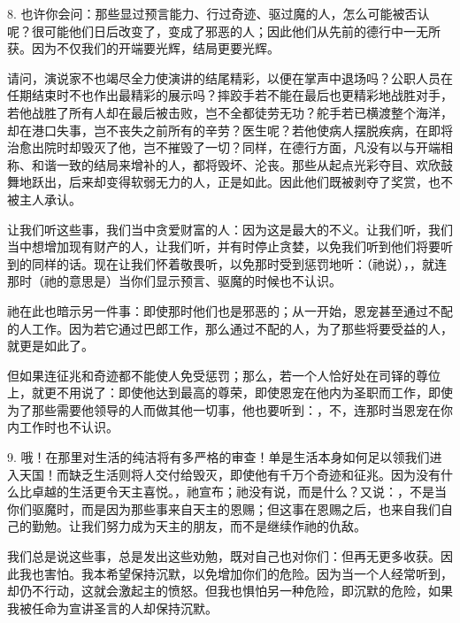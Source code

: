 8. 也许你会问：那些显过预言能力、行过奇迹、驱过魔的人，怎么可能被否认呢？很可能他们日后改变了，变成了邪恶的人；因此他们从先前的德行中一无所获。因为不仅我们的开端要光辉，结局更要光辉。\par

请问，演说家不也竭尽全力使演讲的结尾精彩，以便在掌声中退场吗？公职人员在任期结束时不也作出最精彩的展示吗？摔跤手若不能在最后也更精彩地战胜对手，若他战胜了所有人却在最后被击败，岂不全都徒劳无功？舵手若已横渡整个海洋，却在港口失事，岂不丧失之前所有的辛劳？医生呢？若他使病人摆脱疾病，在即将治愈出院时却毁灭了他，岂不摧毁了一切？同样，在德行方面，凡没有以与开端相称、和谐一致的结局来增补的人，都将毁坏、沦丧。那些从起点光彩夺目、欢欣鼓舞地跃出，后来却变得软弱无力的人，正是如此。因此他们既被剥夺了奖赏，也不被主人承认。\par

让我们听这些事，我们当中贪爱财富的人：因为这是最大的不义。让我们听，我们当中想增加现有财产的人，让我们听，并有时停止贪婪，以免我们听到他们将要听到的同样的话。现在让我们怀着敬畏听，以免那时受到惩罚地听：（祂说），，就连那时（祂的意思是）当你们显示预言、驱魔的时候也不认识。\par

祂在此也暗示另一件事：即使那时他们也是邪恶的；从一开始，恩宠甚至通过不配的人工作。因为若它通过巴郎工作，那么通过不配的人，为了那些将要受益的人，就更是如此了。\par

但如果连征兆和奇迹都不能使人免受惩罚；那么，若一个人恰好处在司铎的尊位上，就更不用说了：即使他达到最高的尊荣，即使恩宠在他内为圣职而工作，即使为了那些需要他领导的人而做其他一切事，他也要听到：，不，连那时当恩宠在你内工作时也不认识。\par

9. 哦！在那里对生活的纯洁将有多严格的审查！单是生活本身如何足以领我们进入天国！而缺乏生活则将人交付给毁灭，即使他有千万个奇迹和征兆。因为没有什么比卓越的生活更令天主喜悦。，祂宣布；祂没有说，而是什么？又说：，不是当你们驱魔时，而是因为那些事来自天主的恩赐；但这事在恩赐之后，也来自我们自己的勤勉。让我们努力成为天主的朋友，而不是继续作祂的仇敌。\par

我们总是说这些事，总是发出这些劝勉，既对自己也对你们：但再无更多收获。因此我也害怕。我本希望保持沉默，以免增加你们的危险。因为当一个人经常听到，却仍不行动，这就会激起主的愤怒。但我也惧怕另一种危险，即沉默的危险，如果我被任命为宣讲圣言的人却保持沉默。\par

